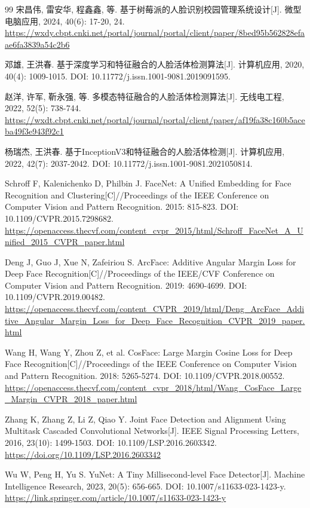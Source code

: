 \documentclass{heuthesis}
\begin{document}
\begin{thebibliography}{99}
宋昌伟, 雷安华, 程鑫鑫, 等. 基于树莓派的人脸识别校园管理系统设计[J]. 微型电脑应用, 2024, 40(6): 17-20, 24. \url{https://wxdy.cbpt.cnki.net/portal/journal/portal/client/paper/8bed95b562828efaae6fa3839a54c2b6}

邓雄, 王洪春. 基于深度学习和特征融合的人脸活体检测算法[J]. 计算机应用, 2020, 40(4): 1009-1015. DOI: 10.11772/j.issn.1001-9081.2019091595.

赵洋, 许军, 靳永强, 等. 多模态特征融合的人脸活体检测算法[J]. 无线电工程, 2022, 52(5): 738-744. \url{https://wxdt.cbpt.cnki.net/portal/journal/portal/client/paper/af19fa38c160b5aceba49f3e943f92c1}

杨瑞杰, 王洪春. 基于InceptionV3和特征融合的人脸活体检测[J]. 计算机应用, 2022, 42(7): 2037-2042. DOI: 10.11772/j.issn.1001-9081.2021050814.

Schroff F, Kalenichenko D, Philbin J. FaceNet: A Unified Embedding for Face Recognition and Clustering[C]//Proceedings of the IEEE Conference on Computer Vision and Pattern Recognition. 2015: 815-823. DOI: 10.1109/CVPR.2015.7298682. \url{https://openaccess.thecvf.com/content_cvpr_2015/html/Schroff_FaceNet_A_Unified_2015_CVPR_paper.html}

Deng J, Guo J, Xue N, Zafeiriou S. ArcFace: Additive Angular Margin Loss for Deep Face Recognition[C]//Proceedings of the IEEE/CVF Conference on Computer Vision and Pattern Recognition. 2019: 4690-4699. DOI: 10.1109/CVPR.2019.00482. \url{https://openaccess.thecvf.com/content_CVPR_2019/html/Deng_ArcFace_Additive_Angular_Margin_Loss_for_Deep_Face_Recognition_CVPR_2019_paper.html}

Wang H, Wang Y, Zhou Z, et al. CosFace: Large Margin Cosine Loss for Deep Face Recognition[C]//Proceedings of the IEEE Conference on Computer Vision and Pattern Recognition. 2018: 5265-5274. DOI: 10.1109/CVPR.2018.00552. \url{https://openaccess.thecvf.com/content_cvpr_2018/html/Wang_CosFace_Large_Margin_CVPR_2018_paper.html}

Zhang K, Zhang Z, Li Z, Qiao Y. Joint Face Detection and Alignment Using Multitask Cascaded Convolutional Networks[J]. IEEE Signal Processing Letters, 2016, 23(10): 1499-1503. DOI: 10.1109/LSP.2016.2603342. \url{https://doi.org/10.1109/LSP.2016.2603342}

Wu W, Peng H, Yu S. YuNet: A Tiny Millisecond-level Face Detector[J]. Machine Intelligence Research, 2023, 20(5): 656-665. DOI: 10.1007/s11633-023-1423-y. \url{https://link.springer.com/article/10.1007/s11633-023-1423-y}


\end{thebibliography}
\end{document}
